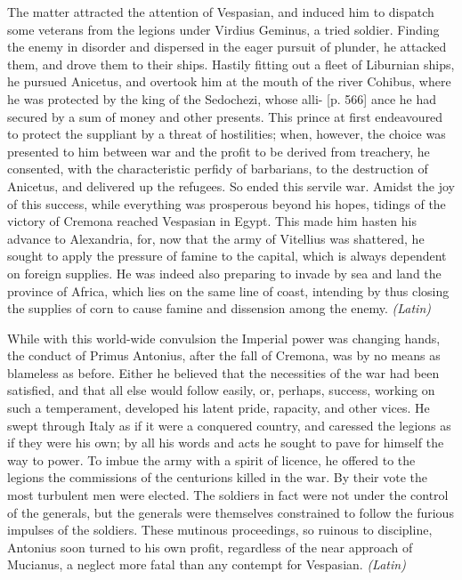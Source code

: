 
The matter attracted the attention of Vespasian, and induced him to dispatch some veterans from the legions under Virdius Geminus, a tried soldier. Finding the enemy in disorder and dispersed in the eager pursuit of plunder, he attacked them, and drove them to their ships. Hastily fitting out a fleet of Liburnian ships, he pursued Anicetus, and overtook him at the mouth of the river Cohibus, where he was protected by the king of the Sedochezi, whose alli- [p. 566] ance he had secured by a sum of money and other presents. This prince at first endeavoured to protect the suppliant by a threat of hostilities; when, however, the choice was presented to him between war and the profit to be derived from treachery, he consented, with the characteristic perfidy of barbarians, to the destruction of Anicetus, and delivered up the refugees. So ended this servile war. Amidst the joy of this success, while everything was prosperous beyond his hopes, tidings of the victory of Cremona reached Vespasian in Egypt. This made him hasten his advance to Alexandria, for, now that the army of Vitellius was shattered, he sought to apply the pressure of famine to the capital, which is always dependent on foreign supplies. He was indeed also preparing to invade by sea and land the province of Africa, which lies on the same line of coast, intending by thus closing the supplies of corn to cause famine and dissension among the enemy. \emph{(Latin)}


While with this world-wide convulsion the Imperial power was changing hands, the conduct of Primus Antonius, after the fall of Cremona, was by no means as blameless as before. Either he believed that the necessities of the war had been satisfied, and that all else would follow easily, or, perhaps, success, working on such a temperament, developed his latent pride, rapacity, and other vices. He swept through Italy as if it were a conquered country, and caressed the legions as if they were his own; by all his words and acts he sought to pave for himself the way to power. To imbue the army with a spirit of licence, he offered to the legions the commissions of the centurions killed in the war. By their vote the most turbulent men were elected. The soldiers in fact were not under the control of the generals, but the generals were themselves constrained to follow the furious impulses of the soldiers. These mutinous proceedings, so ruinous to discipline, Antonius soon turned to his own profit, regardless of the near approach of Mucianus, a neglect more fatal than any contempt for Vespasian. \emph{(Latin)}


